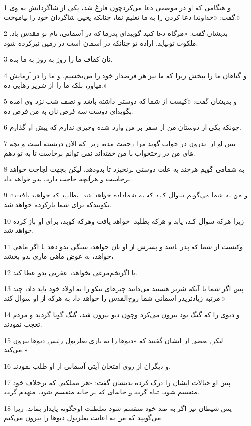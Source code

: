 \par 1 و هنگامی که او در موضعی دعا می‌کردچون فارغ شد، یکی از شاگردانش به وی گفت: «خداوندا دعا کردن را به ما تعلیم نما، چنانکه یحیی شاگردان خود را بیاموخت.»
\par 2 بدیشان گفت: «هرگاه دعا کنید گویید‌ای پدرما که در آسمانی، نام تو مقدس باد. ملکوت توبیاید. اراده تو چنانکه در آسمان است در زمین نیزکرده شود.
\par 3 نان کفاف ما را روز به روز به ما بده.
\par 4 و گناهان ما را ببخش زیرا که ما نیز هر قرضدار خود را می‌بخشیم. و ما را در آزمایش میاور، بلکه ما را از شریر رهایی ده.»
\par 5 و بدیشان گفت: «کیست از شما که دوستی داشته باشد و نصف شب نزد وی آمده بگوید‌ای دوست سه قرص نان به من قرض ده،
\par 6 چونکه یکی از دوستان من از سفر بر من وارد شده وچیزی ندارم که پیش او گذارم.
\par 7 پس او از اندرون در جواب گوید مرا زحمت مده، زیرا که الان دربسته است و بچه های من در رختخواب با من خفته‌اند نمی توانم برخاست تا به تو دهم.
\par 8 به شمامی گویم هر‌چند به علت دوستی برنخیزد تا بدودهد، لیکن بجهت لجاجت خواهد برخاست و هرآنچه حاجت دارد، بدو خواهد داد.
\par 9 «و من به شما می‌گویم سوال کنید که به شماداده خواهد شد. بطلبید که خواهید یافت. بکوبیدکه برای شما بازکرده خواهد شد.
\par 10 زیرا هر‌که سوال کند، یابد و هر‌که بطلبد، خواهد یافت وهرکه کوبد، برای او باز کرده خواهد شد.
\par 11 وکیست از شما که پدر باشد و پسرش از او نان خواهد، سنگی بدو دهد یا اگر ماهی خواهد، به عوض ماهی ماری بدو بخشد،
\par 12 یا اگرتخم‌مرغی بخواهد، عقربی بدو عطا کند.
\par 13 پس اگر شما با آنکه شریر هستید می‌دانید چیزهای نیکو را به اولاد خود باید داد، چند مرتبه زیادترپدر آسمانی شما روح‌القدس را خواهد داد به هرکه از او سوال کند.»
\par 14 و دیوی را که گنگ بود بیرون می‌کرد وچون دیو بیرون شد، گنگ گویا گردید و مردم تعجب نمودند.
\par 15 لیکن بعضی از ایشان گفتند که «دیوها را به یاری بعلزبول رئیس دیوها بیرون می‌کند.»
\par 16 و دیگران از روی امتحان آیتی آسمانی از او طلب نمودند.
\par 17 پس او خیالات ایشان را درک کرده بدیشان گفت: «هر مملکتی که برخلاف خود منقسم شود، تباه گردد و خانه‌ای که بر خانه منقسم شود، منهدم گردد.
\par 18 پس شیطان نیز اگر به ضد خود منقسم شود سلطنت اوچگونه پایدار بماند. زیرا می‌گویید که من به اعانت بعلزبول دیوها را بیرون می‌کنم.
